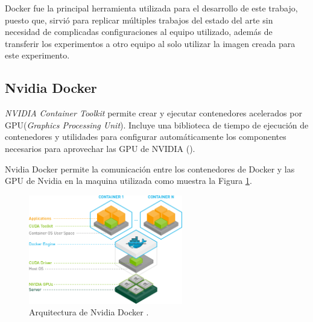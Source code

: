 Docker fue la principal herramienta utilizada para el desarrollo de este trabajo, puesto que, sirvió para replicar múltiples trabajos del estado del arte sin necesidad de complicadas configuraciones al equipo utilizado, además de transferir los experimentos a otro equipo al solo utilizar la imagen creada para este experimento.

\subsection{Nvidia Docker}

\textit{NVIDIA Container Toolkit} permite crear y ejecutar contenedores acelerados por GPU(\textit{Graphics Processing Unit}).
Incluye una biblioteca de tiempo de ejecución de contenedores y utilidades para configurar automáticamente los componentes necesarios para aprovechar las GPU de NVIDIA (\cite{nvidiaDocker2021overview}).

Nvidia Docker permite la comunicación entre los contenedores de Docker y las GPU de Nvidia en la maquina utilizada como muestra la Figura \ref{fig:nvidiaDocker}.

\begin{figure}[H]
    \centering
    \includegraphics[width=0.6\textwidth]{MarcoTeorico/imgs/nvidia-docker.png}
    \caption{Arquitectura de Nvidia Docker \cite{nvidiaDocker2021overview}.}
    \label{fig:nvidiaDocker}
\end{figure}
